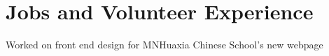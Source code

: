 \documentclass[]{deedy-resume-openfont}
\begin{document}
\begin{minipage}[t]{0.66\textwidth}
\section{Jobs and Volunteer Experience}
\begin{tightemize}
\item Worked on front end design for MNHuaxia Chinese School's new webpage
\end{tightemize}
\sectionsep






\end{minipage} 
\end{document}
